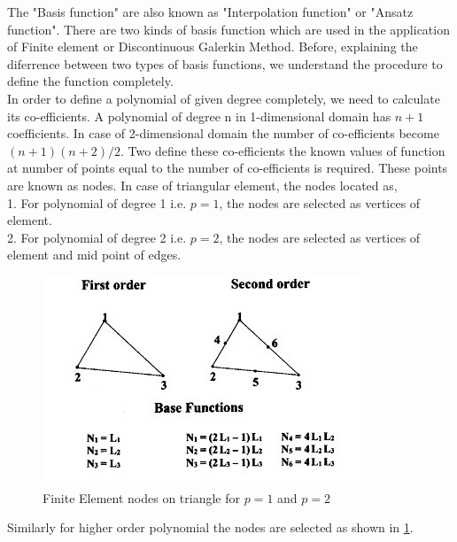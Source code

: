 \documentclass[a4paper,12pt]{book}
\begin{document}
The "Basis function" are also known as "Interpolation function" or "Ansatz function". There are two kinds of basis function which are used in the application of Finite element or Discontinuous Galerkin Method. 
Before, explaining the diferrence between two types of basis functions, we understand the procedure to define the function completely. \\

In order to define a polynomial of given degree completely, we need to calculate its co-efficients. A polynomial of degree n in 1-dimensional domain has $n+1$ coefficients. In case of 2-dimensional domain the number of co-efficients become $(n+1)(n+2)/2$. Two define these co-efficients the known values of function at number of points equal to the number of co-efficients is required. These points are known as nodes. In case of triangular element, the nodes located as,\\

1. For polynomial of degree 1 i.e. $p=1$, the nodes are selected as vertices of element.\\
2. For polynomial of degree 2 i.e. $p=2$, the nodes are selected as vertices of element and mid point of edges.\\

\begin{figure}
  \includegraphics[width=\linewidth]{fem_triangle.jpg}
  \caption{Finite Element nodes on triangle for $p=1$ and $p=2$ \cite{plasma}}
  \label{fig:Nodes on Triangular Element}
\end{figure}

Similarly for higher order polynomial the nodes are selected as shown in \ref{fig:Nodes on Triangular Element}.
\end{document}

